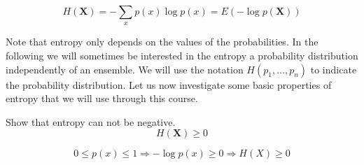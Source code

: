 \begin{equation}
  \label{eq:mean}
  H(\mathbf{X})=-\sum_{x} p(x)\log p(x) = E(-\log p(\mathbf{X}))
\end{equation}

Note that entropy only depends on the values of the probabilities. In the following we will sometimes be interested in the entropy a probability distribution independently of an ensemble. We will use the notation $H(p_1,\ldots,p_n)$ to indicate the probability distribution. Let us now investigate some basic properties of entropy that we will use through this course.

\begin{exercise}Show that entropy can not be negative.
  \label{lem:entropynonnegative}
  \begin{equation*}
    H(\mathbf{X})\geq 0
  \end{equation*}
\end{exercise}
\begin{solution}
  \begin{equation}
    0 \leq p(x) \leq 1 \Rightarrow -\log p(x) \geq 0 \Rightarrow H(X) \geq 0
  \end{equation}
\end{solution}



